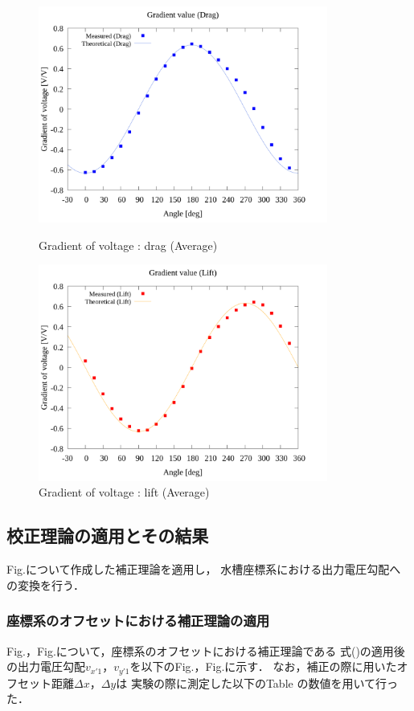 \begin{figure}[htbp]
		\centering
		\includegraphics[width=95mm]{../../02_workspace/result/2-ex/plot/21/21-1_summary_drag.png}
		\caption{Gradient of voltage : drag (Average)}
		\includegraphics[width=95mm]{../../02_workspace/result/2-ex/plot/21/21-1_summary_lift.png}
		\caption{Gradient of voltage : lift (Average)}
\end{figure}

\newpage

\subsection{校正理論の適用とその結果}
Fig.について作成した補正理論を適用し，
水槽座標系における出力電圧勾配への変換を行う．

\subsubsection{座標系のオフセットにおける補正理論の適用}
Fig.，Fig.について，座標系のオフセットにおける補正理論である
式()の適用後の出力電圧勾配$v_{x'1}$，$v_{y'1}$を以下のFig.，Fig.に示す．
なお，補正の際に用いたオフセット距離$\Delta x$，$\Delta y$は
実験の際に測定した以下のTable の数値を用いて行った．

